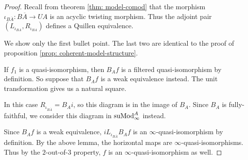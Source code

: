 \documentclass[../thesis.tex]{subfiles}
\begin{document}
            \begin{proof}
                Recall from theorem \ref{thm: model-comod} that the morphism $\iota_{B\overline{A}} : B\overline{A} \to UA$ is an acyclic twisting morphism. Thus the adjoint pair $(L_{\iota_{BA}}, R_{\iota_{BA}})$ defines a Quillen equivalence.

                We show only the first bullet point. The last two are identical to the proof of proposition \ref{prop: coherent-model-structure}.

                If $f_1$ is a quasi-isomorphism, then $B_Af$ is a filtered quasi-isomorphism by definition. So suppose that $B_Af$ is a weak equivalence instead. The unit transformation gives us a natural square.

                \begin{center}
                \end{center}

                In this case $R_{\iota_{B\overline{A}}} = B_Ai$, so this diagram is in the image of $B_A$. Since $B_A$ is fully-faithful, we consider this diagram in $\tt{suMod}_\infty^A$ instead.

                \begin{center}
                \end{center}

                Since $B_Af$ is a weak equivalence, $iL_{\iota_{B\overline{A}}}B_Af$ is an $\infty$-quasi-isomorphism by definition. By the above lemma, the horizontal maps are $\infty$-quasi-isomorphisms. Thus by the $2$-out-of-$3$ property, $f$ is an $\infty$-quasi-isomorphism as well.
            \end{proof}
\end{document}
